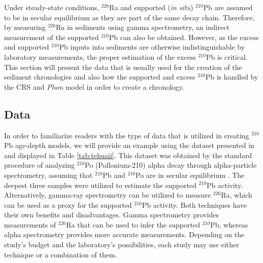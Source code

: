\documentclass [10pt] {article}
\newcommand{\ac}{\color{red} }  %
\newcommand{\ca}{\color{black}} %
\begin{document}
Under steady-state conditions, $^{226}$Ra and supported (\textit{in situ}) $^{210}$Pb are assumed to be in secular equilibrium as they are part of the same decay chain. Therefore, by measuring $^{226}$Ra in sediments using gamma spectrometry, an indirect measurement of the supported $^{210}$Pb can also be obtained.
However, as the excess and supported $^{210}$Pb inputs into sediments are otherwise indistinguishable by laboratory measurements, the proper estimation of the excess $^{210}$Pb is critical.
This section will present the data that is usually used for the creation of the sediment chronologies and also how the supported and excess $^{210}$Pb is handled by the CRS and \textit{Plum} model in order to create a chronology.

\subsection{Data}

In order to familiarize readers with the type of data that is utilized in creating $^{210}$Pb age-depth models, we will provide an example using the dataset presented in \citet{Sanchez-Cabeza2012} and displayed in Table \ref{tab:tehuaii}. This dataset was obtained by the standard procedure of analyzing $^{210}$Po (Pollonium-210) alpha decay  through alpha-particle spectrometry, assuming that $^{210}$Pb and $^{210}$Po are in secular equilibrium \citep[see][for details]{Sanchez-Cabeza2012}. The deepest three samples were utilized to estimate the supported $^{210}$Pb activity. Alternatively, gamma-ray spectrometry can be utilized to measure $^{226}$Ra, which can be used as a proxy for the supported $^{210}$Pb activity. Both techniques have their own benefits and disadvantages. Gamma spectrometry provides measurements of $^{226}$Ra that can be used to infer the supported $^{210}$Pb, whereas alpha spectrometry provides more accurate measurements. Depending on the study's budget and the laboratory's possibilities, each study may use either technique or a combination of them.


\end{document}
